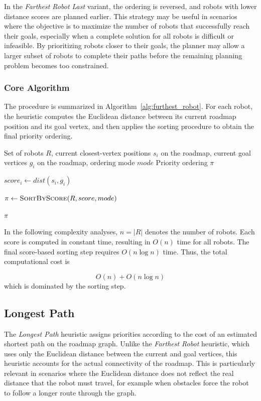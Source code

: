 In the \textit{Farthest Robot Last} variant, the ordering is reversed, and robots with lower distance scores are planned earlier. This strategy may be useful in scenarios where the objective is to maximize the number of robots that successfully reach their goals, especially when a complete solution for all robots is difficult or infeasible. By prioritizing robots closer to their goals, the planner may allow a larger subset of robots to complete their paths before the remaining planning problem becomes too constrained.

\subsubsection{Core Algorithm}
\label{subsubsec:furthest_robot_pseudocode}
\hspace{\parindent}
The procedure is summarized in Algorithm~\ref{alg:furthest_robot}. For each robot, the heuristic computes the Euclidean distance between its current roadmap position and its goal vertex, and then applies the sorting procedure to obtain the final priority ordering.

\begin{algorithm}[H]
\caption{Farthest Robot Heuristic}
\label{alg:furthest_robot}
\begin{algorithmic}[1]
\Require Set of robots \(R\), current closest-vertex positions \(s_i\) on the roadmap, current goal vertices \(g_i\) on the roadmap, ordering mode \(mode\)
\Ensure Priority ordering \(\pi\)

    \State \(score_i \gets dist(s_i, g_i)\)
\EndFor

\State \(\pi \gets \textsc{SortByScore}(R, score, mode)\)

\State \Return \(\pi\)
\end{algorithmic}
\end{algorithm}

In the following complexity analyses, \(n = |R|\) denotes the number of robots. Each score is computed in constant time, resulting in \(O(n)\) time for all robots. The final score-based sorting step requires \(O(n \log n)\) time. Thus, the total computational cost is

\begin{equation}
    O(n) + O(n \log n)
\end{equation}
which is dominated by the sorting step.

\subsection{Longest Path}
\label{subsec:longest_path}
\hspace{\parindent}
The \textit{Longest Path} heuristic assigns priorities according to the cost of an estimated shortest path on the roadmap graph. Unlike the \textit{Farthest Robot} heuristic, which uses only the Euclidean distance between the current and goal vertices, this heuristic accounts for the actual connectivity of the roadmap. This is particularly relevant in scenarios where the Euclidean distance does not reflect the real distance that the robot must travel, for example when obstacles force the robot to follow a longer route through the graph.


